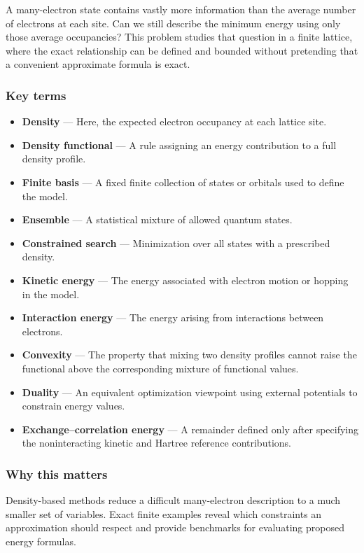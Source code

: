 \documentclass[
  11pt,
]{article}
\begin{document}
A many-electron state contains vastly more information than the average
number of electrons at each site. Can we still describe the minimum
energy using only those average occupancies? This problem studies that
question in a finite lattice, where the exact relationship can be
defined and bounded without pretending that a convenient approximate
formula is exact.

\subsubsection{Key terms}

\begin{itemize}
\item
  \textbf{Density} --- Here, the expected electron occupancy at each
  lattice site.
\item
  \textbf{Density functional} --- A rule assigning an energy
  contribution to a full density profile.
\item
  \textbf{Finite basis} --- A fixed finite collection of states or
  orbitals used to define the model.
\item
  \textbf{Ensemble} --- A statistical mixture of allowed quantum states.
\item
  \textbf{Constrained search} --- Minimization over all states with a
  prescribed density.
\item
  \textbf{Kinetic energy} --- The energy associated with electron motion
  or hopping in the model.
\item
  \textbf{Interaction energy} --- The energy arising from interactions
  between electrons.
\item
  \textbf{Convexity} --- The property that mixing two density profiles
  cannot raise the functional above the corresponding mixture of
  functional values.
\item
  \textbf{Duality} --- An equivalent optimization viewpoint using
  external potentials to constrain energy values.
\item
  \textbf{Exchange--correlation energy} --- A remainder defined only
  after specifying the noninteracting kinetic and Hartree reference
  contributions.
\end{itemize}

\subsubsection{Why this matters}

Density-based methods reduce a difficult many-electron description to a
much smaller set of variables. Exact finite examples reveal which
constraints an approximation should respect and provide benchmarks for
evaluating proposed energy formulas.
\end{document}
